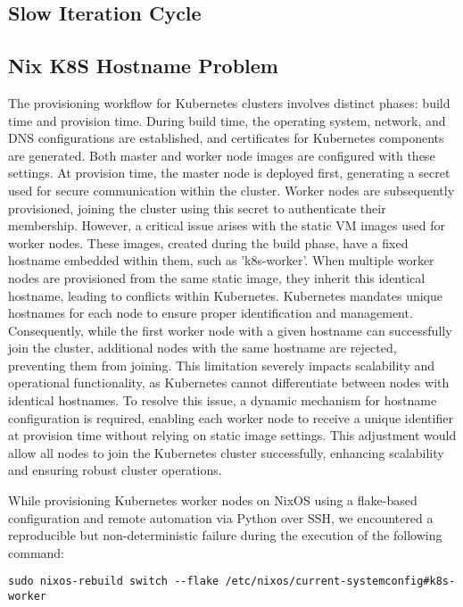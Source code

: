 \subsection{Slow Iteration Cycle}

\subsection{Nix K8S Hostname Problem}

The provisioning workflow for Kubernetes clusters involves distinct phases: build time and provision time. During build time, the operating system, network, and DNS configurations are established, and certificates for Kubernetes components are generated. Both master and worker node images are configured with these settings. At provision time, the master node is deployed first, generating a secret used for secure communication within the cluster. Worker nodes are subsequently provisioned, joining the cluster using this secret to authenticate their membership. However, a critical issue arises with the static VM images used for worker nodes. These images, created during the build phase, have a fixed hostname embedded within them, such as 'k8s-worker'. When multiple worker nodes are provisioned from the same static image, they inherit this identical hostname, leading to conflicts within Kubernetes. Kubernetes mandates unique hostnames for each node to ensure proper identification and management. Consequently, while the first worker node with a given hostname can successfully join the cluster, additional nodes with the same hostname are rejected, preventing them from joining. This limitation severely impacts scalability and operational functionality, as Kubernetes cannot differentiate between nodes with identical hostnames. To resolve this issue, a dynamic mechanism for hostname configuration is required, enabling each worker node to receive a unique identifier at provision time without relying on static image settings. This adjustment would allow all nodes to join the Kubernetes cluster successfully, enhancing scalability and ensuring robust cluster operations.

While provisioning Kubernetes worker nodes on NixOS using a flake-based configuration and remote automation via Python over SSH, we encountered a reproducible but non-deterministic failure during the execution of the following command:

\begin{verbatim}
sudo nixos-rebuild switch --flake /etc/nixos/current-systemconfig#k8s-worker
\end{verbatim}

